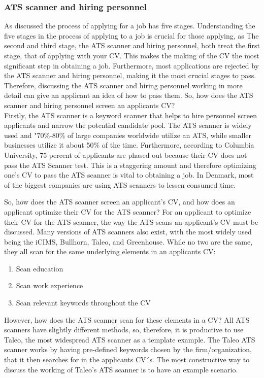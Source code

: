 \subsubsection{ATS scanner and hiring personnel} \label{ATS scanner and hiring personnel}
As discussed the process of applying for a job has five stages.
Understanding the five stages in the process of applying to a job is crucial for those applying, as 
The second and third stage, the ATS scanner and hiring personnel, both treat the first stage, that of applying with your CV.
This makes the making of the CV the most significant step in obtaining a job.
Furthermore, most applications are rejected by the ATS scanner and hiring personnel, making it the most crucial stages to pass.
Therefore, discussing the ATS scanner and hiring personnel working in more detail can give an applicant an idea of how to pass them.
So, how does the ATS scanner and hiring personnel screen an applicants CV? \\

Firstly, the ATS scanner is a keyword scanner that helps to hire personnel screen applicants and narrow the potential candidate pool.
The ATS scanner is widely used and "70\%-80\% of large companies worldwide utilize an ATS, while smaller businesses utilize it about 50\% of the time.\cite{ATS_Usage}
Furthermore, according to Columbia University, 75 percent of applicants are phased out because their CV does not pass the ATS Scanner test.
This is a staggering amount and therefore optimizing one's CV to pass the ATS scanner is vital to obtaining a job.
In Denmark, most of the biggest companies are using ATS scanners to lessen consumed time.\cite{ATS_Denmark}

So, how does the ATS scanner screen an applicant's CV, and how does an applicant optimize their CV for the ATS scanner?
For an applicant to optimize their CV for the ATS scanner, the way the ATS scans an applicant's CV must be discussed.
Many versions of ATS scanners also exist, with the most widely used being the iCIMS, Bullhorn, Taleo, and Greenhouse.
While no two are the same, they all scan for the same underlying elements in an applicants CV:
\begin{enumerate}
   \item Scan education
   \item Scan work experience
   \item Scan relevant keywords throughout the CV
\end{enumerate}
However, how does the ATS scanner scan for these elements in a CV?
All ATS scanners have slightly different methods, so, therefore, it is productive to use Taleo, the most widespread ATS scanner as a template example.
The Taleo ATS scanner works by having pre-defined keywords chosen by the firm/organization, that it then searches for in the applicants CV´s.\cite{ATS_Taleo}
The most constructive way to discuss the working of Taleo's ATS scanner is to have an example scenario. \\


